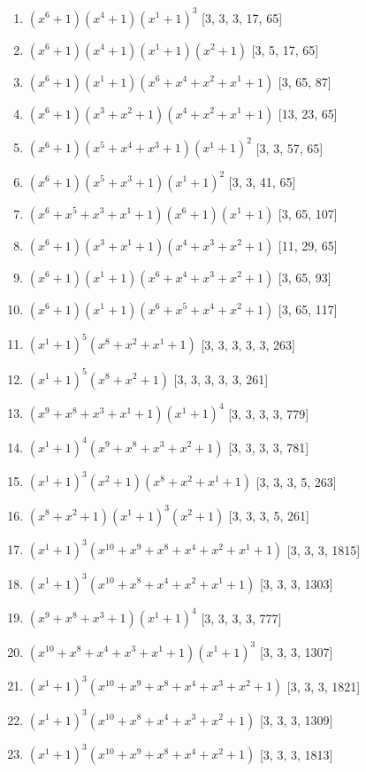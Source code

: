 \documentclass[10pt,twocolumn]{article}
\begin{document}
\begin{enumerate}
\item $(x^{6} + 1)(x^{4} + 1)(x^{1} + 1)^{3}$  [3, 3, 3, 17, 65]
\item $(x^{6} + 1)(x^{4} + 1)(x^{1} + 1)(x^{2} + 1)$  [3, 5, 17, 65]
\item $(x^{6} + 1)(x^{1} + 1)(x^{6} + x^{4} + x^{2} + x^{1} + 1)$  [3, 65, 87]
\item $(x^{6} + 1)(x^{3} + x^{2} + 1)(x^{4} + x^{2} + x^{1} + 1)$  [13, 23, 65]
\item $(x^{6} + 1)(x^{5} + x^{4} + x^{3} + 1)(x^{1} + 1)^{2}$  [3, 3, 57, 65]
\item $(x^{6} + 1)(x^{5} + x^{3} + 1)(x^{1} + 1)^{2}$  [3, 3, 41, 65]
\item $(x^{6} + x^{5} + x^{3} + x^{1} + 1)(x^{6} + 1)(x^{1} + 1)$  [3, 65, 107]
\item $(x^{6} + 1)(x^{3} + x^{1} + 1)(x^{4} + x^{3} + x^{2} + 1)$  [11, 29, 65]
\item $(x^{6} + 1)(x^{1} + 1)(x^{6} + x^{4} + x^{3} + x^{2} + 1)$  [3, 65, 93]
\item $(x^{6} + 1)(x^{1} + 1)(x^{6} + x^{5} + x^{4} + x^{2} + 1)$  [3, 65, 117]
\item $(x^{1} + 1)^{5}(x^{8} + x^{2} + x^{1} + 1)$  [3, 3, 3, 3, 3, 263]
\item $(x^{1} + 1)^{5}(x^{8} + x^{2} + 1)$  [3, 3, 3, 3, 3, 261]
\item $(x^{9} + x^{8} + x^{3} + x^{1} + 1)(x^{1} + 1)^{4}$  [3, 3, 3, 3, 779]
\item $(x^{1} + 1)^{4}(x^{9} + x^{8} + x^{3} + x^{2} + 1)$  [3, 3, 3, 3, 781]
\item $(x^{1} + 1)^{3}(x^{2} + 1)(x^{8} + x^{2} + x^{1} + 1)$  [3, 3, 3, 5, 263]
\item $(x^{8} + x^{2} + 1)(x^{1} + 1)^{3}(x^{2} + 1)$  [3, 3, 3, 5, 261]
\item $(x^{1} + 1)^{3}(x^{10} + x^{9} + x^{8} + x^{4} + x^{2} + x^{1} + 1)$  [3, 3, 3, 1815]
\item $(x^{1} + 1)^{3}(x^{10} + x^{8} + x^{4} + x^{2} + x^{1} + 1)$  [3, 3, 3, 1303]
\item $(x^{9} + x^{8} + x^{3} + 1)(x^{1} + 1)^{4}$  [3, 3, 3, 3, 777]
\item $(x^{10} + x^{8} + x^{4} + x^{3} + x^{1} + 1)(x^{1} + 1)^{3}$  [3, 3, 3, 1307]
\item $(x^{1} + 1)^{3}(x^{10} + x^{9} + x^{8} + x^{4} + x^{3} + x^{2} + 1)$  [3, 3, 3, 1821]
\item $(x^{1} + 1)^{3}(x^{10} + x^{8} + x^{4} + x^{3} + x^{2} + 1)$  [3, 3, 3, 1309]
\item $(x^{1} + 1)^{3}(x^{10} + x^{9} + x^{8} + x^{4} + x^{2} + 1)$  [3, 3, 3, 1813]

\end{enumerate}
\end{document}
